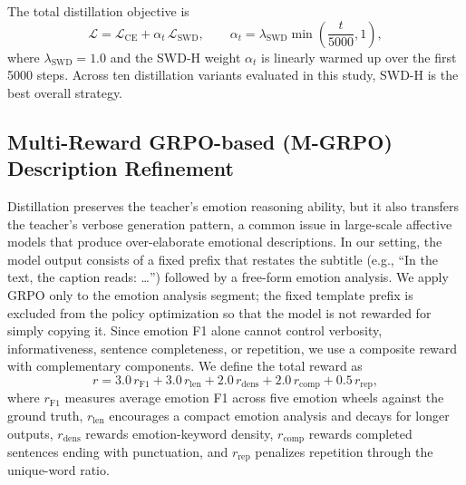 \documentclass[sigconf]{acmart}
\begin{document}
The total distillation objective is
\begin{equation}
\mathcal{L}
=
\mathcal{L}_{\mathrm{CE}}
+
\alpha_t\,\mathcal{L}_{\mathrm{SWD}},
\qquad
\alpha_t
=
\lambda_{\mathrm{SWD}}
\min\!\left(\frac{t}{5000},1\right),
\end{equation}
where $\lambda_{\mathrm{SWD}}=1.0$ and the SWD-H weight $\alpha_t$ is linearly warmed up over the first 5000 steps. Across ten distillation variants evaluated in this study, SWD-H is the best overall strategy.



\subsection{Multi-Reward GRPO-based (M-GRPO) Description Refinement} \label{M-GRPO}

Distillation preserves the teacher's emotion reasoning ability, but it also transfers the teacher's verbose generation pattern, a common issue in large-scale affective models that produce over-elaborate emotional descriptions.
In our setting, the model output consists of a fixed prefix that restates the subtitle (e.g., ``In the text, the caption reads: \ldots'') followed by a free-form emotion analysis.
We apply GRPO only to the emotion analysis segment; the fixed template prefix is excluded from the policy optimization so that the model is not rewarded for simply copying it. Since emotion F1 alone cannot control verbosity, informativeness, sentence completeness, or repetition, we use a composite reward with complementary components.
We define the total reward as
\begin{equation}
r
=
3.0\,r_{\mathrm{F1}}
+
3.0\,r_{\mathrm{len}}
+
2.0\,r_{\mathrm{dens}}
+
2.0\,r_{\mathrm{comp}}
+
0.5\,r_{\mathrm{rep}},
\end{equation}
where $r_{\mathrm{F1}}$ measures average emotion F1 across five emotion wheels against the ground truth, $r_{\mathrm{len}}$ encourages a compact emotion analysis and decays for longer outputs, $r_{\mathrm{dens}}$ rewards emotion-keyword density, $r_{\mathrm{comp}}$ rewards completed sentences ending with punctuation, and $r_{\mathrm{rep}}$ penalizes repetition through the unique-word ratio.
\end{document}
